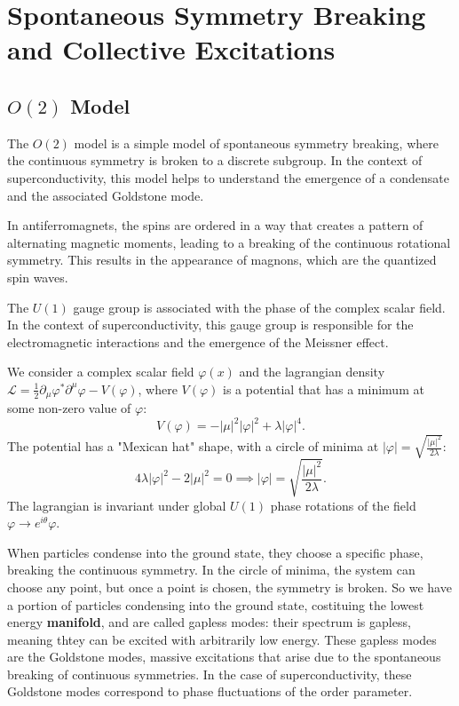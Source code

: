 \section{Spontaneous Symmetry Breaking and Collective Excitations}

\subsection{\(O(2)\) Model}

The \(O(2)\) model is a simple model of spontaneous symmetry breaking, where the continuous symmetry is broken to a discrete subgroup. In the context of superconductivity, this model helps to understand the emergence of a condensate and the associated Goldstone mode.

In antiferromagnets, the spins are ordered in a way that creates a pattern of alternating magnetic moments, leading to a breaking of the continuous rotational symmetry. This results in the appearance of magnons, which are the quantized spin waves.

The \( U(1) \) gauge group is associated with the phase of the complex scalar field. In the context of superconductivity, this gauge group is responsible for the electromagnetic interactions and the emergence of the Meissner effect.

We consider a complex scalar field \(\varphi(x)\) and the lagrangian density \(\mathcal{L} = \frac{1}{2} \partial_\mu \varphi^* \partial^\mu \varphi - V(\varphi)\), where \(V(\varphi)\) is a potential that has a minimum at some non-zero value of \(\varphi\):
\[
    V(\varphi) = - \vert \mu \vert^2 \vert \varphi \vert^2 + \lambda \vert \varphi \vert^4.
\]
The potential has a "Mexican hat" shape, with a circle of minima at \(\vert \varphi \vert = \sqrt{\frac{\vert \mu \vert^2}{2\lambda}}\): 
\[
    4 \lambda \vert \varphi \vert^2 - 2 \vert \mu \vert^2 = 0 \implies \vert \varphi \vert = \sqrt{\frac{\vert \mu \vert^2}{2\lambda}}.
\]
The lagrangian is invariant under global \(U(1)\) phase rotations of the field \(\varphi \to e^{i\theta} \varphi\).

When particles condense into the ground state, they choose a specific phase, breaking the continuous symmetry. In the circle of minima, the system can choose any point, but once a point is chosen, the symmetry is broken. So we have a portion of particles condensing into the ground state, costituing the lowest energy \textbf{manifold}, and are called gapless modes: their spectrum is gapless, meaning thtey can be excited with arbitrarily low energy. These gapless modes are the Goldstone modes, massive excitations that arise due to the spontaneous breaking of continuous symmetries. In the case of superconductivity, these Goldstone modes correspond to phase fluctuations of the order parameter.

